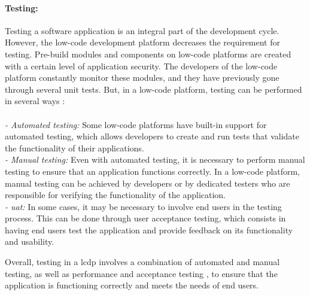 \paragraph{Testing:}
Testing a software application is an integral part of the development cycle.
However, the low-code development platform decreases the requirement for testing. 
Pre-build modules and components on low-code platforms are created with a certain level of application security. 
The developers of the low-code platform constantly monitor these modules, and they have previously gone through several unit tests.
But, in a low-code platform, testing can be performed in several ways \cite{misc:lowcode:testing}: \\\\
\textit{- Automated testing:} Some low-code platforms have built-in support for automated testing, which allows developers to create and run tests that validate the functionality of their applications.\\
\textit{- Manual testing:} Even with automated testing, it is necessary to perform manual testing to ensure that an application functions correctly. In a low-code platform, manual testing can be achieved by developers or by dedicated testers who are responsible for verifying the functionality of the application.\\
\textit{- \ac{uat}:} In some cases, it may be necessary to involve end users in the testing process. This can be done through user acceptance testing, which consists in having end users test the application and provide feedback on its functionality and usability.

Overall, testing in a \ac{lcdp} involves a combination of automated and manual testing, as well as performance and acceptance testing \cite{misc:lowcode:testing}, to ensure that the application is functioning correctly and meets the needs of end users.

